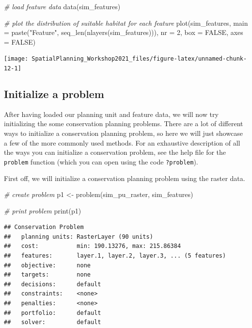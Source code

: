 \documentclass[
  12pt,
]{book}
\newenvironment{Shaded}{\begin{snugshade}}{\end{snugshade}}
\newcommand{\AttributeTok}[1]{\textcolor[rgb]{0.77,0.63,0.00}{#1}}
\newcommand{\CommentTok}[1]{\textcolor[rgb]{0.56,0.35,0.01}{\textit{#1}}}
\newcommand{\ConstantTok}[1]{\textcolor[rgb]{0.00,0.00,0.00}{#1}}
\newcommand{\DecValTok}[1]{\textcolor[rgb]{0.00,0.00,0.81}{#1}}
\newcommand{\FunctionTok}[1]{\textcolor[rgb]{0.00,0.00,0.00}{#1}}
\newcommand{\NormalTok}[1]{#1}
\newcommand{\OtherTok}[1]{\textcolor[rgb]{0.56,0.35,0.01}{#1}}
\newcommand{\StringTok}[1]{\textcolor[rgb]{0.31,0.60,0.02}{#1}}
\begin{document}
\begin{Shaded}
\begin{Highlighting}[]
\CommentTok{\# load feature data}
\FunctionTok{data}\NormalTok{(sim\_features)}

\CommentTok{\# plot the distribution of suitable habitat for each feature}
\FunctionTok{plot}\NormalTok{(sim\_features, }\AttributeTok{main =} \FunctionTok{paste}\NormalTok{(}\StringTok{"Feature"}\NormalTok{, }\FunctionTok{seq\_len}\NormalTok{(}\FunctionTok{nlayers}\NormalTok{(sim\_features))),}
     \AttributeTok{nr =} \DecValTok{2}\NormalTok{, }\AttributeTok{box =} \ConstantTok{FALSE}\NormalTok{, }\AttributeTok{axes =} \ConstantTok{FALSE}\NormalTok{)}
\end{Highlighting}
\end{Shaded}

\begin{center}\texttt{[image: SpatialPlanning\_Workshop2021\_files/figure-latex/unnamed-chunk-12-1]} \end{center}

\hypertarget{initialize-a-problem}{%
\subsection{Initialize a problem}\label{initialize-a-problem}}

After having loaded our planning unit and feature data, we will now try initializing the some conservation planning problems. There are a lot of different ways to initialize a conservation planning problem, so here we will just showcase a few of the more commonly used methods. For an exhaustive description of all the ways you can initialize a conservation problem, see the help file for the \texttt{problem} function (which you can open using the code \texttt{?problem}).

First off, we will initialize a conservation planning problem using the raster data.

\begin{Shaded}
\begin{Highlighting}[]
\CommentTok{\# create problem}
\NormalTok{p1 }\OtherTok{\textless{}{-}} \FunctionTok{problem}\NormalTok{(sim\_pu\_raster, sim\_features)}

\CommentTok{\# print problem}
\FunctionTok{print}\NormalTok{(p1)}
\end{Highlighting}
\end{Shaded}

\begin{verbatim}
## Conservation Problem
##   planning units: RasterLayer (90 units)
##   cost:           min: 190.13276, max: 215.86384
##   features:       layer.1, layer.2, layer.3, ... (5 features)
##   objective:      none
##   targets:        none
##   decisions:      default
##   constraints:    <none>
##   penalties:      <none>
##   portfolio:      default
##   solver:         default
\end{verbatim}
\end{document}
